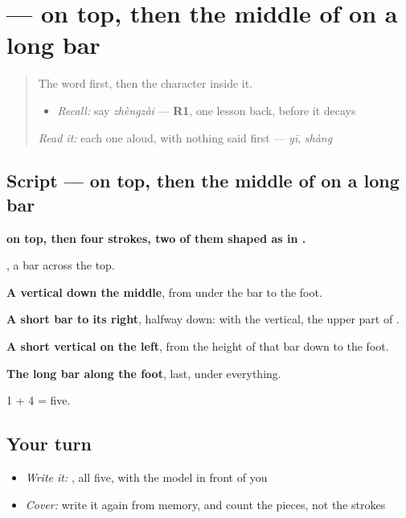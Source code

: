 \section[\texorpdfstring{\zh{正} (zhèng)}{正 (zhèng)}]{ —  on top, then the middle of  on a long bar}

\label{lesson:ZH-W149-zheng}



\begin{quote}
The word first, then the character inside it.

\begin{itemize}
\raggedright
  \item \emph{Recall:} say \emph{zhèngzài} — \textbf{R1}, one lesson back, before it decays
\end{itemize}

\begin{quote}
 
\end{quote}

\emph{Read it:} each one aloud, with nothing said first — \emph{yī}, \emph{shàng}
\end{quote}

\subsection*{Script —  on top, then the middle of  on a long bar}

\begin{quote}
\end{quote}

\textbf{ on top, then four strokes, two of them shaped as in .}

\textbf{}, a bar across the top.

\textbf{A vertical down the middle}, from under the bar to the foot.

\textbf{A short bar to its right}, halfway down: with the vertical, the upper part of .

\textbf{A short vertical on the left}, from the height of that bar down to the foot.

\textbf{The long bar along the foot}, last, under everything.

1 + 4 = five.

\subsection*{Your turn}
\begin{itemize}
\raggedright
  \item \emph{Write it:} , all five, with the model in front of you
  \item \emph{Cover:} write it again from memory, and count the pieces, not the strokes
\end{itemize}

